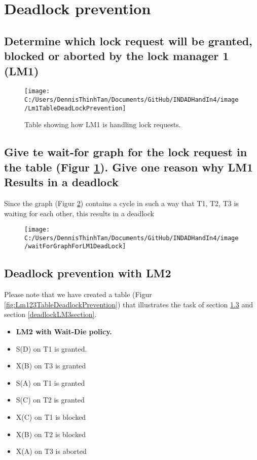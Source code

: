\section{Deadlock prevention}
\subsection{Determine which lock request will be granted, blocked or aborted by the lock manager 1 (LM1)}

\begin{figure}
\centering
\texttt{[image: C:/Users/DennisThinhTan/Documents/GitHub/INDADHandIn4/image/Lm1TableDeadLockPrevention]}
\caption[Table showing how LM1 is handling locks]{Table showing how LM1 is handling lock requests.}
\label{fig:Lm1TableDeadlock}
\end{figure}

\subsection{Give te wait-for graph for the lock request in the table (Figur \ref{fig:Lm1TableDeadlock}). Give one reason why LM1 Results in a deadlock }

Since the graph (Figur \ref{fig:waitForGraphForLM1DeadLock}) contains a cycle in such a way that T1, T2, T3 is waiting for each other, this results in a deadlock

\begin{figure}
\centering
\texttt{[image: C:/Users/DennisThinhTan/Documents/GitHub/INDADHandIn4/image/waitForGraphForLM1DeadLock]}
\caption[Wait-for graph of LM1 depicting a deadlock.]{}
\caption{}
\label{fig:waitForGraphForLM1DeadLock}
\end{figure}

	

\subsection{Deadlock prevention with LM2} \label{deadlockLM2section}
Please note that we have created a table (Figur \ref{fig:Lm123TableDeadlockPrevention}) that illustrates the task of section \ref{deadlockLM2section} and section \ref{deadlockLM3section}.
\begin{itemize}
	\item{\textbf{LM2 with Wait-Die policy.}}
	\item S(D) on T1 is granted.
	\item X(B) on T3 is granted
	\item S(A) on T1 is granted
	\item S(C) on T2 is granted
	\item X(C) on T1 is blocked
	\item X(B) on T2 is blocked
	\item X(A) on T3 is aborted
\end{itemize}

